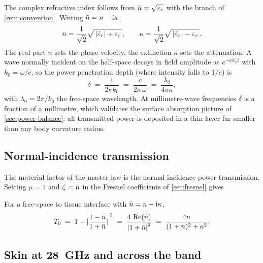 The complex refractive index follows from $\tilde{n}=\sqrt{\tilde{\varepsilon}_r}$ with the
branch of \cref{rem:convention}. Writing $\tilde{n}=n-\mathrm{i}\kappa$,
\begin{equation}\label{eq:n-kappa}
  n = \frac{1}{\sqrt{2}}\sqrt{\,\abs{\tilde{\varepsilon}_r}+\varepsilon_r\,},
  \qquad
  \kappa = \frac{1}{\sqrt{2}}\sqrt{\,\abs{\tilde{\varepsilon}_r}-\varepsilon_r\,}.
\end{equation}
The real part $n$ sets the phase velocity, the extinction $\kappa$ sets the
attenuation. A wave normally incident on the half-space decays in field
amplitude as $e^{-\kappa k_0 z}$ with $k_0=\omega/c$, so the power penetration
depth (where intensity falls to $1/e$) is
\begin{equation}\label{eq:penetration}
  \delta \;=\; \frac{1}{2\kappa k_0}
  \;=\; \frac{c}{2\kappa\,\omega}
  \;=\; \frac{\lambda_0}{4\pi\kappa},
\end{equation}
with $\lambda_0=2\pi/k_0$ the free-space wavelength. At millimetre-wave
frequencies $\delta$ is a fraction of a millimetre, which validates the surface
absorption picture of \cref{sec:power-balance}: all transmitted power is
deposited in a thin layer far smaller than any body curvature radius.

\subsection{Normal-incidence transmission}\label{sec:T0-from-n}

The material factor of the master law is the normal-incidence power
transmission. Setting $\mu=1$ and $\zeta=\tilde{n}$ in the Fresnel coefficients of
\cref{sec:fresnel} gives

\begin{proposition}\label{prop:T0}
For a free-space to tissue interface with $\tilde{n}=n-\mathrm{i}\kappa$,
\begin{equation}\label{eq:T0}
  T_0 \;=\; 1 - \abs*{\frac{1-\tilde{n}}{1+\tilde{n}}}^2
  \;=\; \frac{4\,\operatorname{Re}(\tilde{n})}{\abs{1+\tilde{n}}^2}
  \;=\; \frac{4n}{(1+n)^2+\kappa^2}.
\end{equation}
\end{proposition}

\subsection{Skin at 28~GHz and across the band}\label{sec:skin-numbers}

